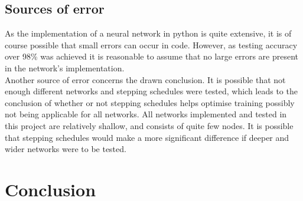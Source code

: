 \documentclass{article}
\begin{document}
\subsection{Sources of error}
As the implementation of a neural network in python is quite extensive, it is of course possible that small errors can occur in code. However, as testing accuracy over 98\% was achieved it is reasonable to assume that no large errors are present in the network's implementation. \\

\noindent Another source of error concerns the drawn conclusion. It is possible that not enough different networks and stepping schedules were tested, which leads to the conclusion of whether or not stepping schedules helps optimise training possibly not being applicable for all networks. All networks implemented and tested in this project are relatively shallow, and consists of quite few nodes. It is possible that stepping schedules would make a more significant difference if deeper and wider networks were to be tested. 

\section{Conclusion}
\end{document}
